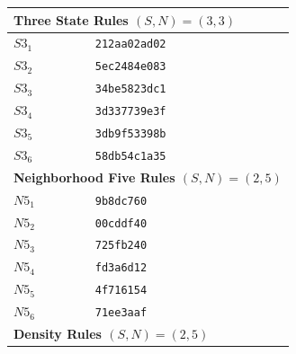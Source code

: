 \documentclass{elsarticle}
\begin{document}
\begin{multicols}{2}
\begin{table}[!htbp] \centering
\small
\begin{tabular}{|p{2cm}|l|}
\hline
\multicolumn{2}{|l|}{\textbf{Three State Rules \boldmath$(S,N) = (3,3)$}} \\ 
\hline
$S3_{1}$ &  \verb|212aa02ad02|\\ \hline
$S3_{2}$ &  \verb|5ec2484e083|\\ \hline
$S3_{3}$ &  \verb|34be5823dc1|\\ \hline
$S3_{4}$ &  \verb|3d337739e3f|\\ \hline
$S3_{5}$ &  \verb|3db9f53398b|\\ \hline
$S3_{6}$ &  \verb|58db54c1a35|\\ \hline
\multicolumn{2}{|l|}{\textbf{Neighborhood Five Rules \boldmath$(S,N) = (2,5)$}} 
\\ \hline
$N5_{1}$ &   \verb|9b8dc760|\\ \hline
$N5_{2}$ &   \verb|00cddf40|\\ \hline
$N5_{3}$ &   \verb|725fb240|\\ \hline
$N5_{4}$ &   \verb|fd3a6d12|\\ \hline
$N5_{5}$ &   \verb|4f716154|\\ \hline
$N5_{6}$ &   \verb|71ee3aaf|\\ \hline
\multicolumn{2}{|l|}{\textbf{Density Rules \boldmath$(S,N) = (2,5)$}} \\ \hline

\end{tabular}
\end{table}
\end{multicols}
\end{document}
